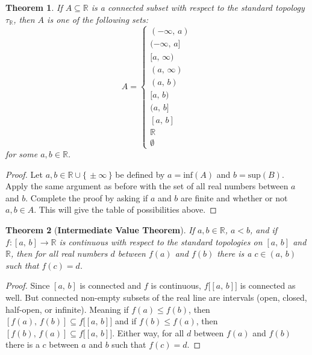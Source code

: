 \documentclass{article}
\theoremstyle{plain}
\newtheorem{theorem}{Theorem}[section]
\theoremstyle{normal}
\begin{document}
         \begin{theorem}
            If $A\subseteq\mathbb{R}$ is a connected subset with respect to the
            standard topology $\tau_{\mathbb{R}}$, then $A$ is one of the
            following sets:
            \begin{equation}
                A=
                \begin{cases}
                    (-\infty,\,a)\\
                    (-\infty,\,a]\\
                    [a,\,\infty)\\
                    (a,\,\infty)\\
                    (a,\,b)\\
                    [a,\,b)\\
                    (a,\,b]\\
                    [a,\,b]\\
                    \mathbb{R}\\
                    \emptyset
                \end{cases}
            \end{equation}
            for some $a,b\in\mathbb{R}$.
         \end{theorem}
         \begin{proof}
            Let $a,b\in\mathbb{R}\cup\{\,\pm\infty\,\}$ be defined by
            $a=\textrm{inf}(A)$ and $b=\textrm{sup}(B)$. Apply the same
            argument as before with the set of all real numbers between $a$ and
            $b$. Complete the proof by asking if $a$ and $b$ are finite and
            whether or not $a,b\in{A}$. This will give the table of
            possibilities above.
         \end{proof}
         \begin{theorem}[\textbf{Intermediate Value Theorem}]
            If $a,b\in\mathbb{R}$, $a<b$, and if
            $f:[a,\,b]\rightarrow\mathbb{R}$ is continuous with respect to the
            standard topologies on $[a,\,b]$ and $\mathbb{R}$, then for all
            real numbers $d$ between $f(a)$ and $f(b)$ there is a $c\in(a,\,b)$
            such that $f(c)=d$.
         \end{theorem}
         \begin{proof}
            Since $[a,\,b]$ is connected and $f$ is continuous,
            $f\big[[a,\,b]\big]$ is connected as well. But connected
            non-empty subsets of the real line are intervals
            (open, closed, half-open, or infinite). Meaning if
            $f(a)\leq{f}(b)$, then $[f(a),\,f(b)]\subseteq{f}\big[[a,\,b]\big]$
            and if $f(b)\leq{f}(a)$, then
            $[f(b),\,f(a)]\subseteq{f}\big[[a,\,b]\big]$. Either way, for
            all $d$ between $f(a)$ and $f(b)$ there is a $c$ between $a$ and $b$
            such that $f(c)=d$.
         \end{proof}
\end{document}
